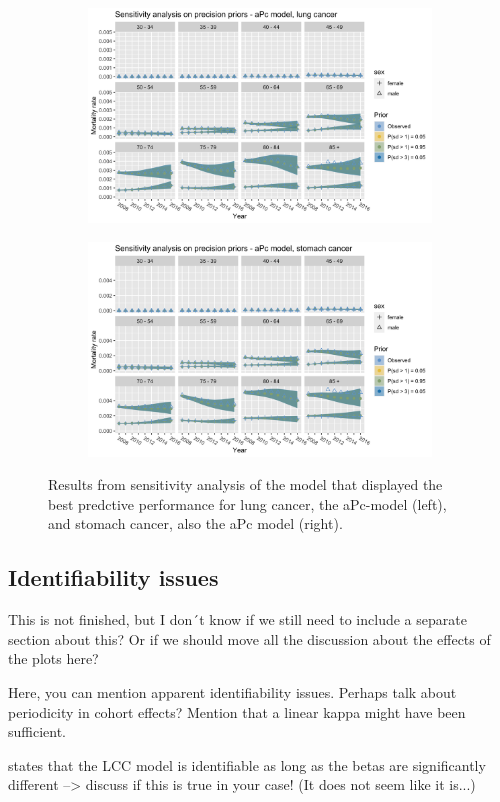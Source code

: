 \begin{figure}[h!]
    \centering
    \begin{subfigure}[b]{.45\linewidth}
        \includegraphics[width=\linewidth]{real-data/real-data-multivariate/Figures/sensitivity-analysis-aPc-by-period-lung.png}
    \end{subfigure}
    \begin{subfigure}[b]{.45\linewidth}
        \includegraphics[width=\linewidth]{real-data/real-data-multivariate/Figures/sensitivity-analysis-aPc-by-period-stomach.png}
    \end{subfigure}
    \caption{Results from sensitivity analysis of the model that displayed the best predctive performance for lung cancer, the aPc-model (left), and stomach cancer, also the aPc model (right). }
    \label{fig:mv-sensitivity}
\end{figure}

\newpage 
\subsection{Identifiability issues}
\textcolor{myDarkBlue}{This is not finished, but I don´t know if we still need to include a separate section about this? Or if we should move all the discussion about the effects of the plots here? }
\textcolor{myDarkGreen}{
Here, you can mention apparent identifiability issues. Perhaps talk about periodicity in cohort effects? Mention that a linear kappa might have been sufficient. 

\parencite{Wisniowski2015} states that the LCC model is identifiable as long as the betas are significantly different --> discuss if this is true in your case! (It does not seem like it is...)
}